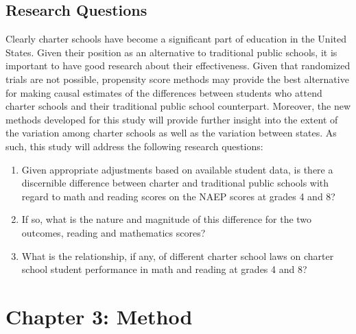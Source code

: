 \documentclass[letterpaper,12p,twoside]{article} %
\begin{document}
\subsection{Research Questions}

Clearly charter schools have become a significant part of education in the United States. Given their position as an alternative to traditional public schools, it is important to have good research about their effectiveness. Given that randomized trials are not possible, propensity score methods may provide the best alternative for making causal estimates of the differences between students who attend charter schools and their traditional public school counterpart. Moreover, the new methods developed for this study will provide further insight into the extent of the variation among charter schools as well as the variation between states. As such, this study will address the following research questions:

\begin{enumerate}
\item Given appropriate adjustments based on available student data, is there a discernible difference between charter and traditional public schools with regard to math and reading scores on the NAEP scores at grades 4 and 8? 
\item If so, what is the nature and magnitude of this difference for the two outcomes, reading and mathematics scores?  
\item What is the relationship, if any, of different charter school laws on charter school student performance in math and reading at grades 4 and 8?  
\end{enumerate}

\cleardoublepage
\section{Chapter 3: Method}
\end{document}
